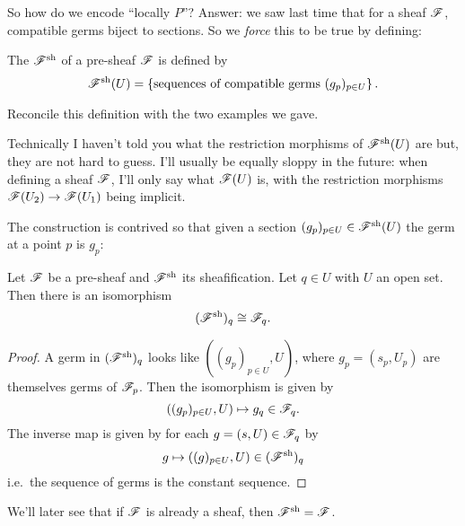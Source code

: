 So how do we encode ``locally $P$''?
Answer: we saw last time that for a sheaf $\mathscr F$,
compatible germs biject to sections.
So we \emph{force} this to be true by defining:
\begin{definition}
	The  $\mathscr F^\mathrm{sh}$ of a pre-sheaf $\mathscr F$ is defined by
	\[ \mathscr F^\mathrm{sh}(U) =
		\left\{ \text{sequences of compatible
		germs $(g_p)_{p \in U}$} \right\}.  \]
\end{definition}
\begin{exercise}
	Reconcile this definition with the two examples we gave.
\end{exercise}
\begin{abuse}
	Technically I haven't told you what the restriction morphisms
	of $\mathscr F^\mathrm{sh}(U)$ are but, they are not hard to guess.
	I'll usually be equally sloppy in the future:
	when defining a sheaf $\mathscr F$, I'll only say what $\mathscr F(U)$ is,
	with the restriction morphisms $\mathscr F(U_2) \to \mathscr F(U_1)$ being implicit.
\end{abuse}
The construction is contrived so that given a section
$(g_p)_{p \in U} \in \mathscr F^\mathrm{sh}(U)$ the germ at a point $p$ is $g_p$:
\begin{lemma}
	\label{lem:pre_sheaf_stalk}
	Let $\mathscr F$ be a pre-sheaf and $\mathscr F^\mathrm{sh}$ its sheafification.
	Let $q \in U$ with $U$ an open set.
	Then there is an isomorphism
	\[ (\mathscr F^\mathrm{sh})_q \cong \mathscr F_q. \]
\end{lemma}
\begin{proof}
	A germ in $(\mathscr F^\mathrm{sh})_q$ looks like 
	$\left( (g_p)_{p \in U}, U \right)$,
	where $g_p = (s_p, U_p)$ are themselves germs of $\mathscr F_p$.
	Then the isomorphism is given by
	\[ \left( (g_p)_{p \in U}, U \right) \mapsto g_q \in \mathscr F_q. \]
	The inverse map is given by for each $g = (s,U) \in \mathscr F_q$ by
	\[ g \mapsto \left( (g)_{p \in U}, U \right) \in (\mathscr F^\mathrm{sh})_q \]
	i.e.\ the sequence of germs is the constant sequence.
\end{proof}

We'll later see that if $\mathscr F$ is already a sheaf, then $\mathscr F^\mathrm{sh} = \mathscr F$.

